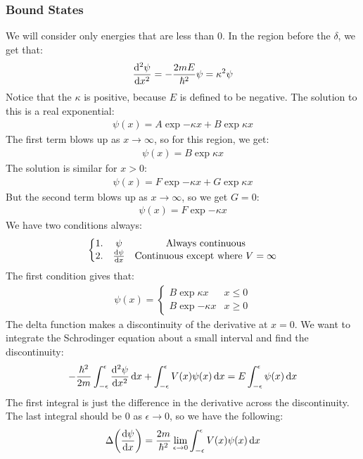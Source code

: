\subsubsection{Bound States}
We will consider only energies that are less than $0$. In the region before the $\delta$, we get that:
\begin{align*}
  \dv[2]{\psi}{x}=-\dfrac{2mE}{\hbar^2}\psi=\kappa^2\psi
\end{align*}
Notice that the $\kappa$ is positive, because $E$ is defined to be negative. The solution to this is a real exponential:
\begin{align*}
  \psi(x)=A\exp{-\kappa x}+B\exp{\kappa x}
\end{align*}
The first term blows up as $x\to\infty$, so for this region, we get:
\begin{align*}
  \psi(x)=B\exp{\kappa x}
\end{align*}
The solution is similar for $x>0$:
\begin{align*}
  \psi(x)=F\exp{-\kappa x}+G\exp{\kappa x}
\end{align*}
But the second term blows up as $x\to\infty$, so we get $G=0$:
\begin{align*}
  \psi(x)=F\exp{-\kappa x}
\end{align*}
We have two conditions always:
\begin{align*}
  \left\{\mqty{
    1. & \psi & \text{Always continuous} \\
    2. & \dv{\psi}{x} & \text{Continuous except where $V=\infty$}
  }\right.
\end{align*}
The first condition gives that:
\begin{align*}
  \psi(x)=
  \begin{cases}
    B\exp{\kappa x} & x \leq 0 \\
    B\exp{-\kappa x} & x \geq 0
  \end{cases}
\end{align*}
The delta function makes a discontinuity of the derivative at $x=0$. We want to integrate the Schrodinger equation about a small interval and find the discontinuity:
\begin{align*}
  -\dfrac{\hbar^2}{2m}\int_{-\epsilon}^\epsilon\dv[2]{\psi}{x}\dd{x}
  +\int_{-\epsilon}^{\epsilon}V(x)\psi(x)\dd{x}=E\int_{-\epsilon}^{\epsilon}\psi(x)\dd{x}
\end{align*}
The first integral is just the difference in the derivative across the discontinuity. The last integral should be $0$ as $\epsilon\to 0$, so we have the following:
\begin{align*}
  \Delta\qty(\dv{\psi}{x})=\dfrac{2m}{\hbar^2}
  \lim_{\epsilon\to 0}\int_{-\epsilon}^{\epsilon}V(x)\psi(x)\dd{x}
\end{align*}
